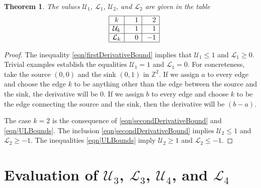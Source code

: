 \documentclass[reqno]{amsart}
\newtheorem{theorem}{Theorem}[section]
\begin{document}
\begin{theorem} \label{thm|Case2}
The values $\mathcal U_1$, $\mathcal L_1$, $\mathcal U_2$, and $\mathcal L_2$ are
given in the table \begin{eqnarray*}&&
\begin{array}{|c|r|r| }
\hline 
k&{\quad}1&{\quad}2\\
\hline
\mathcal U_k&1&1 \\
\hline 
\mathcal L_k&0&-1 \\
\hline
\end{array} 
\end{eqnarray*}
\end{theorem}
   \begin{proof} The inequality \eqref{eqn|firstDerivativeBound} implies that $\mathcal U_1\leq 1$ and $\mathcal L_1\geq 0$. Trivial examples establish the equalities 
   $\mathcal U_1=1$ and $\mathcal L_1=0$. 
For concreteness, take the source $(0,0)$ and the sink $(0,1)$ in $\mathbb Z^2$.
   If we assign $a$ to every edge and choose the edge $k$ to be anything other than the edge between the source and the sink, the derivative will be $0$. If we assign $b$ to every edge and choose $k$ to be the edge connecting the source and the sink, then the derivative will be $(b-a)$. 
   
 The case $k=2$ is the consequence of \eqref{eqn|secondDerivativeBound} and \eqref{eqn|ULBounds}. The inclusion \eqref{eqn|secondDerivativeBound} implies 
 $\mathcal U_2\leq 1$ and $\mathcal L_2\geq -1$. The inequalities \eqref{eqn|ULBounds} imply 
 $\mathcal U_2\geq 1$ and $\mathcal L_2\leq -1$.
   \end{proof}

   
 
 
 
 
 
    
 


\section{Evaluation of $\mathcal U_3$, $\mathcal L_3$, $\mathcal U_4$, and $\mathcal L_4$} 
 
\end{document}
